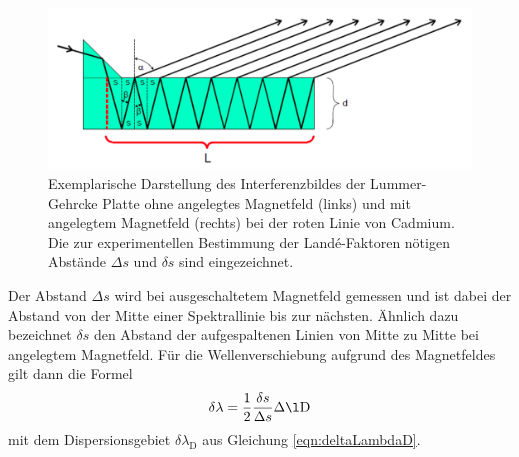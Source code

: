 \begin{figure}
  \centering
  \includegraphics[width=\textwidth]{data/lummer.png}
  \caption{Exemplarische Darstellung des Interferenzbildes der Lummer-Gehrcke Platte ohne angelegtes Magnetfeld (links) und mit angelegtem Magnetfeld (rechts) bei der roten Linie von Cadmium. Die zur experimentellen Bestimmung der Landé-Faktoren nötigen Abstände $\Delta s$ und $\delta s$ sind eingezeichnet. \cite{Versuchsanleitung}}
  \label{fig:abstaende}
\end{figure}

Der Abstand $\Delta s$ wird bei ausgeschaltetem Magnetfeld gemessen und ist dabei der Abstand von der Mitte einer Spektrallinie bis zur nächsten. Ähnlich dazu bezeichnet $\delta s$ den Abstand der aufgespaltenen Linien von Mitte zu Mitte bei angelegtem Magnetfeld.
Für die Wellenverschiebung aufgrund des Magnetfeldes gilt dann die Formel
\begin{equation}
  \delta \lambda = \frac{1}{2} \frac{\delta s}{\Delta s} \Delta \l\text{D}
  \label{eqn:deltaLambda}
\end{equation}
mit dem Dispersionsgebiet $\delta \lambda_\text{D}$ aus Gleichung \eqref{eqn:deltaLambdaD}.

\cite{add Theoretische Daten Lummer}
